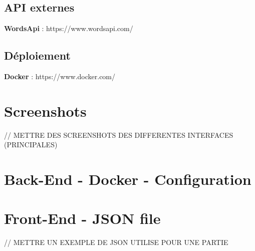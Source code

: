 \documentclass{tnreport}
\begin{document}
\section{API externes}
\textbf{WordsApi} : https://www.wordsapi.com/\\

\section{Déploiement}
\textbf{Docker} : https://www.docker.com/\\


\cleardoublepage

\chapter{Screenshots}

// METTRE DES SCREENSHOTS DES DIFFERENTES INTERFACES (PRINCIPALES) \\

\cleardoublepage

\chapter{Back-End - Docker - Configuration}
\label{annexe:docker_compose}
\vspace{0.5cm}
\begin{center}
	\vspace*{-0.8in}
	
\end{center}

\cleardoublepage

\chapter{Front-End - JSON file}

// METTRE UN EXEMPLE DE JSON UTILISE POUR UNE PARTIE \\
\end{document}
